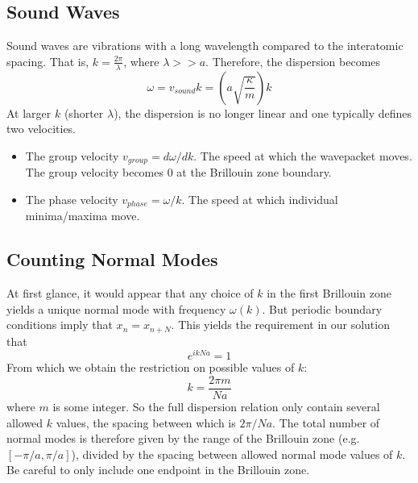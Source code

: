 \documentclass[10pt]{article}
\begin{document}
\subsection{Sound Waves}
Sound waves are vibrations with a long wavelength compared to the interatomic spacing. That is, $k = \frac{2\pi}{\lambda}$, where $\lambda >> a$.
Therefore, the dispersion becomes
$$\omega = v_{sound}k = \left ( a \sqrt{\frac{\kappa}{m}}\right)k$$
At larger $k$ (shorter $\lambda$), the dispersion is no longer linear and one typically defines two velocities.
\begin{itemize}
  \item The group velocity $v_{group} = d\omega /dk$. The speed at which the wavepacket moves. The group velocity becomes 0 at the Brillouin zone boundary.
  \item The phase velocity $v_{phase} = \omega / k$. The speed at which individual minima/maxima move.
\end{itemize}

\subsection{Counting Normal Modes}
At first glance, it would appear that any choice of $k$ in the first Brillouin zone yields a unique normal mode with frequency $\omega(k)$.
But periodic boundary conditions imply that $x_{n} = x_{n + N}$. This yields the requirement in our solution that
$$e^{ikNa} = 1$$
From which we obtain the restriction on possible values of $k$:
$$k = \frac{2\pi m}{Na}$$
where $m$ is some integer. So the full dispersion relation only contain several allowed $k$ values, the spacing between which is $2\pi/Na$.
The total number of normal modes is therefore given by the range of the Brillouin zone (e.g. $[-\pi/a,\pi/a]$), divided by the spacing between
allowed normal mode values of $k$. Be careful to only include one endpoint in the Brillouin zone.
\end{document}
